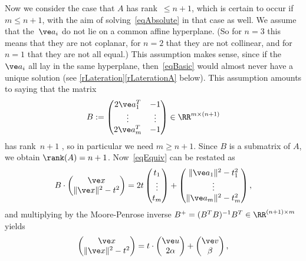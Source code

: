 \documentclass[reqno]{amsart}
\begin{document}
Now we consider the case that $A$ has rank~$\le n+1$, which is certain
to occur if $m \le n+1$, with the aim of solving~\eqref{eqAbsolute} in that case as well. We assume that the~$\ve a_i$ do not lie on a common affine
hyperplane. (So for
$n = 3$ this means that they are not coplanar, for $n = 2$ that they
are not collinear, and for $n = 1$ that they are not all equal.) This
assumption makes sense, since if the~$\ve a_i$ all lay in the same
hyperplane, then~\eqref{eqBasic} would almost never have a unique
solution (see \cref{rLateration}\ref{rLaterationA} below).
This assumption amounts to saying that the matrix
\begin{equation} \label{eqB}%
  B :=
  \begin{pmatrix}
    2 \ve a_1^T & -1 \\
    \vdots & \vdots \\
    2 \ve a_m^T & -1
  \end{pmatrix} \in \RR^{m \times (n+1)}
\end{equation}
has rank~$n+1$%
, so in particular we need $m \ge n+1$. Since $B$ is a submatrix of
$A$, we obtain $\rank(A) = n+1$. Now~\eqref{eqEquiv} can be restated
as
\begin{equation} \label{eqBxt}%
  B \cdot 
  \begin{pmatrix}
    \ve x \\
    \lVert\ve x\rVert^2 - t^2
  \end{pmatrix} =
  2 t \begin{pmatrix}
    t_1 \\
    \vdots \\
    t_m
  \end{pmatrix} + \begin{pmatrix}
    \lVert\ve a_1\rVert^2 - t_1^2 \\
    \vdots \\
    \lVert\ve a_m\rVert^2 - t_m^2
  \end{pmatrix},
\end{equation}
and multiplying by the Moore-Penrose inverse
$B^+ = (B^T B)^{-1} B^T \in \RR^{(n+1) \times m}$ yields
\begin{equation} \label{eqXUV}%
  \begin{pmatrix}
    \ve x \\
    \lVert\ve x\rVert^2 - t^2
  \end{pmatrix} = t \cdot
  \begin{pmatrix}
    \ve u \\
    2 \alpha
  \end{pmatrix} +
  \begin{pmatrix}
    \ve v \\
    \beta
  \end{pmatrix},
\end{equation}
\end{document}
